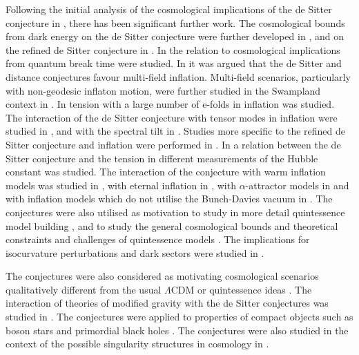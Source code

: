 \documentclass[11pt,a4paper]{article}
\numberwithin{equation}{section}
\numberwithin{table}{section}\setlength{\multlinegap}{25pt}
\begin{document}
{Following the initial analysis of the cosmological implications of the de Sitter conjecture in \cite{Agrawal:2018own}, there has been significant further work. The cosmological bounds from dark energy on the de Sitter conjecture were further developed in \cite{Heisenberg:2018yae,Cicoli:2018kdo,Akrami:2018ylq,Heisenberg:2018rdu,Wang:2018duq,Raveri:2018ddi}, and on the refined de Sitter conjecture in \cite{Agrawal:2018rcg,Chiang:2018lqx,Thompson:2018ifr,Elizalde:2018dvw,Tosone:2018qei}. In \cite{Dvali:2018fqu,Dvali:2018jhn} the relation to cosmological implications from quantum break time were studied. In \cite{Achucarro:2018vey} it was argued that the de Sitter and distance conjectures favour multi-field inflation. Multi-field scenarios, particularly with non-geodesic inflaton motion, were further studied in the Swampland context in \cite{Brown:2017osf,Damian:2018tlf,Landete:2018kqf,Schimmrigk:2018gch,Bjorkmo:2019aev,Fumagalli:2019noh,Bjorkmo:2019fls,Achucarro:2019pux}. In \cite{Garg:2018reu} tension with a large number of e-folds in inflation was studied. The interaction of the de Sitter conjecture with tensor modes in inflation were studied in \cite{Kehagias:2018uem,Dias:2018ngv}, and with the spectral tilt in \cite{Ben-Dayan:2018mhe,Kinney:2018nny}. Studies more specific to the refined de Sitter conjecture and inflation were performed in \cite{Fukuda:2018haz,Lin:2018rnx,Cheong:2018udx,Holman:2018inr,Kinney:2018kew,Seo:2018abc,Kobakhidze:2019ppv}. In \cite{Colgain:2018wgk} a relation between the de Sitter conjecture and the tension in different measurements of the Hubble constant was studied. The interaction of the conjecture with warm inflation models was studied in \cite{Rasouli:2018kvy,Das:2018hqy,Motaharfar:2018zyb,Das:2018rpg,Kamali:2019hgv}, with eternal inflation in \cite{Matsui:2018bsy,Dimopoulos:2018upl}, with $\alpha$-attractor models in \cite{Scalisi:2018eaz} and with inflation models which do not utilise the Bunch-Davies vacuum in \cite{Brahma:2018hrd,Ashoorioon:2018sqb}. The conjectures were also utilised as motivation to study in more detail quintessence model building \cite{Chiang:2018jdg,Emelin:2018igk,Han:2018yrk,DAmico:2018mnx,Olguin-Tejo:2018pfq}, and to study the general cosmological bounds and theoretical constraints and challenges of quintessence models \cite{Marsh:2018kub,Hamaguchi:2018vtv,Acharya:2018deu,Hertzberg:2018suv}. The implications for isocurvature perturbations and dark sectors were studied in \cite{Matsui:2018xwa,Haque:2019prw}.

The conjectures were also considered as motivating cosmological scenarios qualitatively different from the usual $\Lambda$CDM or quintessence ideas \cite{Banerjee:2018qey,Lin:2018kjm,Lehners:2018vgi,Lin:2018edm,Cai:2018ebs,Bramberger:2019zez,Heckman:2018mxl,Heckman:2019dsj}. The interaction of theories of modified gravity with the de Sitter conjectures was studied in \cite{Artymowski:2019vfy,Heisenberg:2019qxz,Brahma:2019kch,Yi:2018dhl}. The conjectures were applied to properties of compact objects such as boson stars \cite{Herdeiro:2018hfp} and primordial black holes \cite{Kawasaki:2018daf}. The conjectures were also studied in the context of the possible singularity structures in cosmology in \cite{Odintsov:2018zai}.

}
\end{document}
